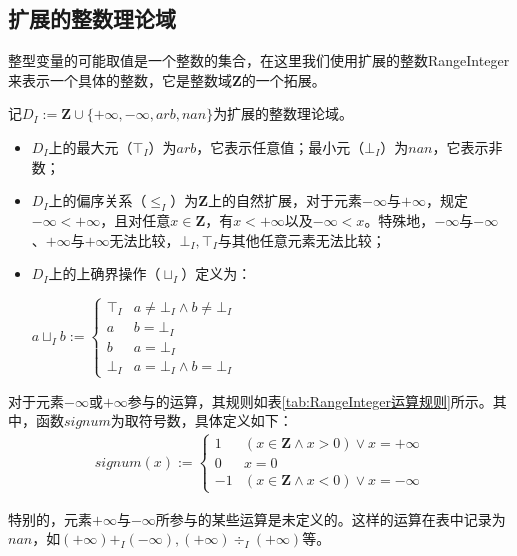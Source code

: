 \subsection{扩展的整数理论域}
\label{sec:Integer}

整型变量的可能取值是一个整数的集合，在这里我们使用扩展的整数RangeInteger来表示一个具体的整数，它是整数域$ \mathbf{Z} $的一个拓展。

\begin{definition}
	记$ D_I := \mathbf{Z} \cup \{ +\infty, -\infty, arb, nan\}  $为扩展的整数理论域。
	\begin{itemize}
		\item $ D_I $上的最大元（$ \top_I $）为$ arb $，它表示任意值；最小元（$ \bot_I $）为$ nan $，它表示非数；
		
		\item $ D_I $上的偏序关系（$ \le_I $）为$ \mathbf{Z} $上的自然扩展，对于元素$ -\infty $与$ +\infty $，规定$ -\infty < +\infty $，且对任意$ x \in \mathbf{Z} $，有$ x < +\infty $以及$ -\infty < x $。特殊地，$ -\infty $与$ -\infty $、$ +\infty $与$ +\infty $无法比较，$ \bot_I, \top_I $与其他任意元素无法比较；
		
		\item $ D_I $上的上确界操作（$ \sqcup_I $）定义为：\\
		\centerline{$ a \sqcup_I b := \begin{cases}
			\top_I & a \ne \bot_I \land b \ne \bot_I\\
			a & b = \bot_I\\
			b & a = \bot_I\\
			\bot_I & a = \bot_I \land b = \bot_I
			\end{cases} $}
	\end{itemize}
\end{definition}

对于元素$ -\infty $或$ +\infty $参与的运算，其规则如表\ref{tab:RangeInteger运算规则}所示。其中，函数$ signum $为取符号数，具体定义如下：
\begin{align}
	signum(x) := \begin{cases}
		1 & (x \in \mathbf{Z} \land x > 0) \lor x = +\infty\\
		0 & x = 0\\
		-1 & (x \in \mathbf{Z} \land x < 0) \lor x = -\infty
	\end{cases}
\end{align}

特别的，元素$ +\infty $与$ -\infty $所参与的某些运算是未定义的。这样的运算在表中记录为$ nan $，如$ (+\infty) +_I (-\infty), (+\infty) \div_I (+\infty)  $等。

